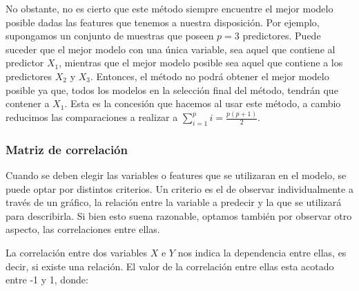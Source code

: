     
    No obstante, no es cierto que este método siempre encuentre el mejor modelo posible dadas las features que tenemos a nuestra disposición. Por ejemplo, supongamos un conjunto de muestras que poseen $p = 3$ predictores. Puede suceder que el mejor modelo con una única variable, sea aquel que contiene al predictor $X_1$, mientras que el mejor modelo posible sea aquel que contiene a los predictores $X_2$ y $X_3$. Entonces, el método no podrá obtener el mejor modelo posible ya que, todos los modelos en la selección final del método, tendrán que contener a $X_1$. Esta es la concesión que hacemos al usar este método, a cambio reducimos las comparaciones a realizar a $\sum_{i=1}^{p}i = \frac{p(p+1)}{2}.$
    
\subsubsection{Matriz de correlación}
    
    Cuando se deben elegir las variables o features que se utilizaran en el modelo, se puede optar por distintos criterios. Un criterio es el de observar individualmente a través de un gráfico, la relación entre la variable a predecir y la que se utilizará para describirla. Si bien esto suena razonable, optamos también por observar otro aspecto, las correlaciones entre ellas. 
    
    La correlación entre dos variables $X$ e $Y$ nos indica la dependencia entre ellas, es decir, si existe una relación. El valor de la correlación entre ellas esta acotado entre -1 y 1, donde:
    
